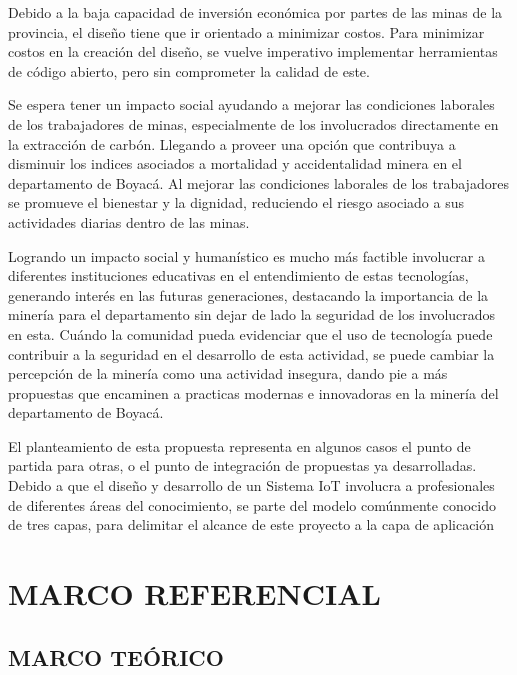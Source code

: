 \documentclass[stu,12pt,floatsintext]{apa7}
\begin{document}
	Debido a la baja capacidad de inversión económica por partes de las minas de la provincia, el diseño tiene que ir orientado a minimizar costos.
	Para minimizar costos en la creación del diseño, se vuelve imperativo implementar herramientas de código abierto, pero sin comprometer la calidad de este.
	
	Se espera tener un impacto social ayudando a mejorar las condiciones laborales de los trabajadores de minas, especialmente de los involucrados directamente en la extracción de carbón. Llegando a proveer una opción que contribuya a disminuir los indices asociados a mortalidad  y accidentalidad 	minera en el departamento de Boyacá.
	Al mejorar las condiciones laborales de los trabajadores se promueve el bienestar y la dignidad, reduciendo el riesgo asociado a sus actividades diarias dentro de las minas.
	
	Logrando un impacto social y humanístico es mucho más factible involucrar a diferentes instituciones educativas en el entendimiento de estas tecnologías, generando interés en las futuras generaciones, destacando la importancia de la minería para el departamento sin dejar de lado la seguridad de los involucrados en esta.
	Cuándo la comunidad pueda evidenciar que el uso de tecnología puede contribuir a la seguridad en el desarrollo de esta actividad, se puede cambiar la percepción de la minería como una actividad insegura, dando pie a más propuestas que encaminen a practicas modernas e innovadoras en la minería del departamento de Boyacá.
	
	El planteamiento de esta propuesta representa en algunos casos el punto de partida para otras, o el punto de integración de propuestas ya desarrolladas.
	Debido a que el diseño y desarrollo de un Sistema IoT involucra a profesionales de diferentes áreas del conocimiento, se parte del modelo comúnmente conocido de tres capas, para delimitar el alcance de este proyecto a la capa de aplicación
	
	\section{MARCO REFERENCIAL}
	\subsection{MARCO TEÓRICO}
\end{document}
